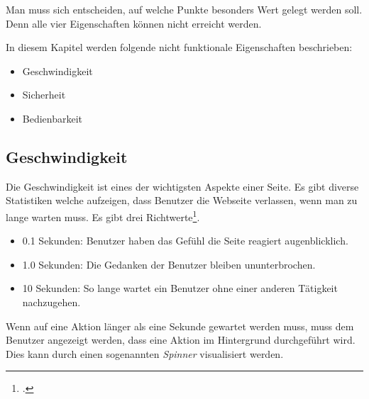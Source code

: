 Man muss sich entscheiden, auf welche Punkte besonders Wert gelegt werden soll. Denn alle vier Eigenschaften können nicht erreicht werden.

In diesem Kapitel werden folgende nicht funktionale Eigenschaften beschrieben:
\begin{itemize}
\item Geschwindigkeit
\item Sicherheit
\item Bedienbarkeit
\end{itemize}

\subsection{Geschwindigkeit}
Die Geschwindigkeit ist eines der wichtigsten Aspekte einer Seite. Es gibt diverse Statistiken welche aufzeigen, dass Benutzer die Webseite verlassen, wenn man zu lange warten muss. Es gibt drei Richtwerte\footcite{Response_Time_Limits_Article_by_Jakob_Nielsen_2015-06-01}.
\begin{itemize}
\item 0.1 Sekunden: Benutzer haben das Gefühl die Seite reagiert augenblicklich.
\item 1.0 Sekunden: Die Gedanken der Benutzer bleiben ununterbrochen.
\item 10 Sekunden: So lange wartet ein Benutzer ohne einer anderen Tätigkeit nachzugehen.
\end{itemize}
Wenn auf eine Aktion länger als eine Sekunde gewartet werden muss, muss dem Benutzer angezeigt werden, dass eine Aktion im Hintergrund durchgeführt wird. Dies kann durch einen sogenannten \textit{Spinner} visualisiert werden.

